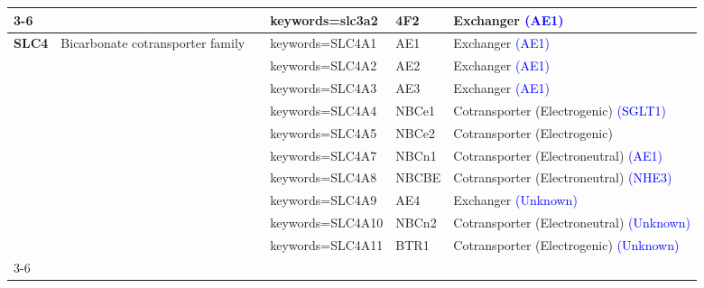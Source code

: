 \documentclass[12pt]{report}
\begin{document}
\begin{center}
\begin{longtable}{|p{1.5cm}|p{3.2cm}|p{1.9cm}|p{1.65cm}|p{3cm}|p{3cm}|}
\cline{3-6}
&&\href{https://www.genecards.org/cgi-bin/carddisp.pl?gene=SLC3A2&keywords=slc3a2}{SLC3A2} &4F2 & Exchanger \textcolor{blue}{(AE1)\cite{quackenbush19874f2}}&\\
\hline
\multirow{10}{1.5cm}{\textbf{SLC4}} & \multirow{10}{4cm}{Bicarbonate cotransporter family \cite{romero2013slc4,liu2015functionSLC4, romero2004function,pushkin2006mechanisms}} & \href{https://www.genecards.org/cgi-bin/carddisp.pl?gene=SLC4A1&keywords=SLC4A1}{SLC4A1} & AE1 & Exchanger \textcolor{blue}{(AE1) \cite{romero2013slc4, weinstein2000AE1, romero2004function,pushkin2006mechanisms}}&\\
\cline{3-6}
&&\href{https://www.genecards.org/cgi-bin/carddisp.pl?gene=SLC4A2&keywords=SLC4A2}{SLC4A2}&AE2 & Exchanger \textcolor{blue}{(AE1) \cite{chernova2003function,zhang1996regulation,concepcion2014phregulation, romero2004function,pushkin2006mechanisms}}&\\
\cline{3-6}
&&\href{https://www.genecards.org/cgi-bin/carddisp.pl?gene=SLC4A3&keywords=SLC4A3}{SLC4A3}&AE3 & Exchanger \textcolor{blue}{(AE1) \cite{romero2004function,pushkin2006mechanisms}}&\\ 
\cline{3-6}
&&\href{https://www.genecards.org/cgi-bin/carddisp.pl?gene=SLC4A4&keywords=SLC4A4}{SLC4A4}&NBCe1 & Cotransporter (Electrogenic) \textcolor{blue}{(SGLT1) \cite{romero2004function,pushkin2006mechanisms, chang2008structure}}&\\ 
\cline{3-6}
&&\href{https://www.genecards.org/cgi-bin/carddisp.pl?gene=SLC4A5&keywords=SLC4A5}{SLC4A5}&NBCe2 & Cotransporter (Electrogenic) \textcolor{blue}{\cite{romero2004function,pushkin2006mechanisms}}&\\ 
\cline{3-6}
&&\href{https://www.genecards.org/cgi-bin/carddisp.pl?gene=SLC4A7&keywords=SLC4A7}{SLC4A7}&NBCn1 & Cotransporter (Electroneutral) \textcolor{blue}{(AE1) \cite{romero2004function,pushkin2006mechanisms}}&\\ 
\cline{3-6}
&&\href{https://www.genecards.org/cgi-bin/carddisp.pl?gene=SLC4A8&keywords=SLC4A8}{SLC4A8}&NBCBE & Cotransporter (Electroneutral) \textcolor{blue}{(NHE3) \cite{romero2004function,pushkin2006mechanisms}}&\\
\cline{3-6}
&&\href{https://www.genecards.org/cgi-bin/carddisp.pl?gene=SLC4A9&keywords=SLC4A9}{SLC4A9}&AE4 & Exchanger \textcolor{blue}{(Unknown)\cite{romero2004function,pushkin2006mechanisms}}&\\ 
\cline{3-6}
&&\href{https://www.genecards.org/cgi-bin/carddisp.pl?gene=SLC4A10&keywords=SLC4A10}{SLC4A10}&NBCn2 & Cotransporter (Electroneutral) \textcolor{blue}{(Unknown)\cite{romero2004function,pushkin2006mechanisms}}&\\ 
\cline{3-6}
&&\href{https://www.genecards.org/cgi-bin/carddisp.pl?gene=SLC4A11&keywords=SLC4A11}{SLC4A11}&BTR1 & Cotransporter (Electrogenic) \textcolor{blue}{(Unknown)\cite{romero2004function,pushkin2006mechanisms}}&\\ 
\cline{3-6}
\hline


\end{longtable}
\end{center}
\end{document}
